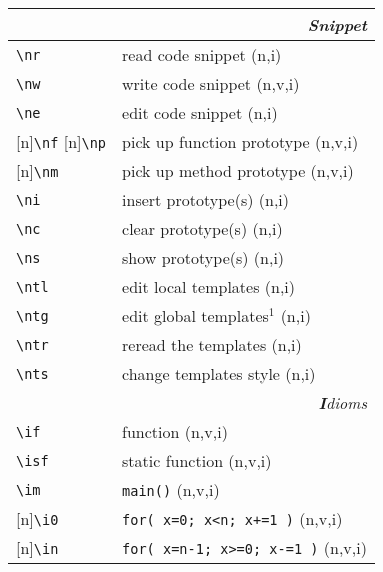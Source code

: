 \documentclass[oneside,11pt,landscape,DIV17]{scrartcl}
\newcommand{\Rep}{{\tiny{[n]}}}
\begin{document}
\begin{multicols}{3}
\begin{center}
%
\begin{tabular}[]{|p{11mm}|p{60mm}|}
\hline 
\multicolumn{2}{|r|}{\textsl{S\textbf{n}ippet}} \\
\hline     \verb'\nr'  & read code snippet         \hfill (n,i)\\
\hline     \verb'\nw'  & write code snippet        \hfill (n,v,i)\\
\hline     \verb'\ne'  & edit code snippet         \hfill (n,i)\\
\hline \Rep\verb'\nf' \Rep\verb'\np'  & pick up function prototype         \hfill (n,v,i)\\
\hline \Rep\verb'\nm'  & pick up method prototype         \hfill (n,v,i)\\
\hline     \verb'\ni'  & insert prototype(s)       \hfill (n,i)\\
\hline     \verb'\nc'  & clear  prototype(s)       \hfill (n,i)\\
\hline     \verb'\ns'  & show   prototype(s)       \hfill (n,i)\\
%
\hline \verb'\ntl' & edit local templates      \hfill (n,i)\\
\hline \verb'\ntg' & edit global templates$^1$ \hfill (n,i)\\
\hline \verb'\ntr' & reread the templates      \hfill (n,i)\\
\hline \verb'\nts' & change templates style    \hfill (n,i)\\
\hline
\hline 
\multicolumn{2}{|r|}{\textsl{\textbf{I}dioms}}   \\
\hline \verb'\if'  & function                         \hfill (n,v,i)\\
\hline \verb'\isf' & static function                  \hfill (n,v,i)\\
\hline \verb'\im'  & \verb'main()'                    \hfill (n,v,i)\\
\hline \Rep\verb'\i0'  & \verb'for( x=0; x<n; x+=1 )'     \hfill (n,v,i)\\
\hline \Rep\verb'\in'  & \verb'for( x=n-1; x>=0; x-=1 )'  \hfill (n,v,i)\\

\end{tabular}
\end{center}
\end{multicols}
\end{document}
